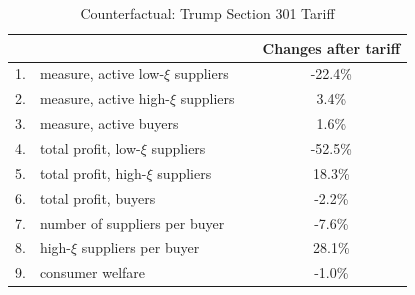 \begin{table}[tbp]
\caption{Counterfactual: Trump Section 301 Tariff}
\label{tab:tariff_experiments}\centering
\resizebox{\textwidth}{!} {

\begin{tabular}{ccccc}
\hline\hline
&  &  &  & Changes after tariff \\
\hline
1. & \multicolumn{2}{l}{measure, active low-$\xi$ suppliers} &  & -22.4\% \\
2. & \multicolumn{2}{l}{measure, active high-$\xi$ suppliers} &  & 3.4\% \\
3. & \multicolumn{2}{l}{measure, active buyers} &  & 1.6\% \\
4. & \multicolumn{2}{l}{total profit, low-$\xi$ suppliers} &  & -52.5\% \\
5. & \multicolumn{2}{l}{total profit, high-$\xi$ suppliers} &  & 18.3\% \\
6. & \multicolumn{2}{l}{total profit, buyers} &  & -2.2\% \\
7. & \multicolumn{2}{l}{number of suppliers per buyer} &  & -7.6\% \\
8. & \multicolumn{2}{l}{high-$\xi$ suppliers per buyer} &  & 28.1\% \\
9. & \multicolumn{2}{l}{consumer welfare} &  & -1.0\% \\
\hline
\end{tabular}
}
\end{table}
